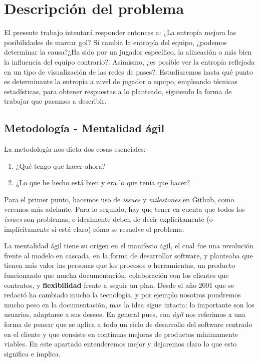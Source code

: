 \chapter{Descripción del problema}
El presente trabajo intentará responder entonces a: ¿La entropía mejora las posibilidades 
de marcar gol? Si cambia la entropía del equipo, ¿podemos determinar la causa?¿Ha sido por un jugador 
específico, la alineación o más bien la influencia del equipo 
contrario?. Asimismo, ¿es posible ver la entropía reflejada en un tipo de visualización de 
las redes de pases?. Estudiaremos hasta qué punto es determinante la 
entropía a nivel de jugador o equipo, empleando técnicas estadísticas, para obtener respuestas a lo planteado, 
siguiendo la forma de trabajar que pasamos a describir.

\section{Metodología - Mentalidad ágil}
La metodología nos dicta dos cosas esenciales:
\begin{enumerate}
    \item ¿Qué tengo que hacer ahora?
    \item ¿Lo que he hecho está bien y era lo que tenía que hacer?
\end{enumerate}

Para el primer punto, hacemos uso de \textit{issues} y \textit{milestones} en Github, 
como veremos más adelante. Para lo segundo, hay que tener en cuenta que todos 
los \textit{issues} son problemas, e idealmente deben de decir explícitamente 
(o implícitamente si está claro) cómo se resuelve el problema.

La mentalidad ágil tiene su origen en el manifesto ágil\cite{manifesto-agil}, el cual fue una revolución frente 
al modelo en cascada,
en la forma de desarrollar software, y planteaba que tienen más valor las personas que 
los procesos o herramientas, un producto funcionando que mucha documentación, colaboración 
con los clientes que contratos, y \textbf{flexibilidad} frente a seguir un plan. Desde el 
año 2001 que se redactó ha cambiado mucho la tecnología, y por ejemplo nosotros pondremos 
mucho peso en la documentación, mas la idea sigue intacta: lo importante son los usuarios, 
adaptarse a sus deseos. En general pues, con \textit{ágil} nos referimos a una forma de pensar que se aplica 
a todo un ciclo de desarrollo del software centrado en el cliente y que consiste en 
continuas mejoras de productos mínimamente viables\cite{agile-science}.
En este apartado entenderemos mejor y dejaremos claro lo que esto significa e implica.

